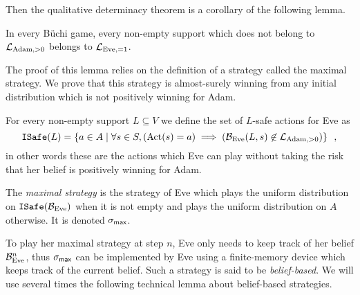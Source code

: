 Then the qualitative determinacy theorem is a corollary of the following lemma.
\begin{lemma}
In every B{\"u}chi game, every non-empty support
which does not belong to $\mathcal{L}_{\text{Adam},>0}$ belongs to $\mathcal{L}_{\text{Eve},=1}$.
\end{lemma}

The proof of this lemma relies on the definition of a strategy
called the maximal strategy.
We prove that this strategy is almost-surely winning from any initial
distribution which is not positively winning for Adam. 

\begin{definition}\label{def:maximalstrategy}
For every non-empty support $L\subseteq V$ we define
 the set  of {$L$-safe} actions for Eve as
\[
{\tt ISafe}(L) = \left\{ a \in A \mid  \forall s \in S, (\text{Act}(s)=a) \implies (\mathcal{B}_{\text{Eve}}(L,s)\not\in\mathcal{L}_{\text{Adam},>0}
  )\right\}\enspace,
\]
in other words these are the actions which Eve can play without taking the risk
that her belief is positively winning for Adam.

The \emph{maximal strategy} is the strategy of Eve
which plays the uniform distribution
on ${\tt ISafe}(\mathcal{B}_{\text{Eve}})$
when it is not empty and plays the uniform distribution on $A$ otherwise.
It is denoted $\sigma_{\textsf{max}}$.

\end{definition}

To play her maximal strategy at step $n$,
Eve only needs to keep track of her belief $\mathcal{B}_{\text{Eve}}^n$,
thus $\sigma_{\textsf{max}}$ can be implemented by Eve 
using a finite-memory device which keeps track of the current belief.
Such a strategy is said to be \emph{belief-based}.
We will use several times  the following technical lemma about belief-based strategies.

